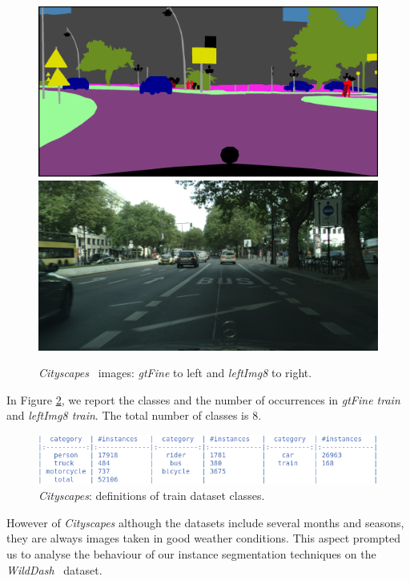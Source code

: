 \documentclass[10pt,twocolumn,letterpaper]{article}
\begin{document}
\begin{figure}[H]
\centering
 \includegraphics[width=0.41\linewidth]{./image/gtFine.png} \quad \includegraphics[width=0.41\linewidth]{./image/leftImg8.png}
  \caption{\textit{Cityscapes}~\cite{cityscapes} images: \textit{gtFine} to left and \textit{leftImg8} to right.}
 \label{fig:image_gtfine}
\noindent
\end{figure}
In Figure \ref{fig:class_definitions_city}, we report the classes and the number of occurrences in \textit{gtFine train} and \textit{leftImg8 train}. The total number of classes is 8.
\begin{figure}[H]
\centering
  \includegraphics[width=0.95\linewidth]{./image/city_class} 
  \caption{\textit{Cityscapes}: definitions of train dataset classes.} %
  \label{fig:class_definitions_city}
\noindent
\end{figure}
However of \textit{Cityscapes} although the datasets include several months and seasons, they are always images taken in good weather conditions. This aspect prompted us to analyse the behaviour of our instance segmentation techniques on the \textit{WildDash}~\cite{wildDash} dataset.
\end{document}
